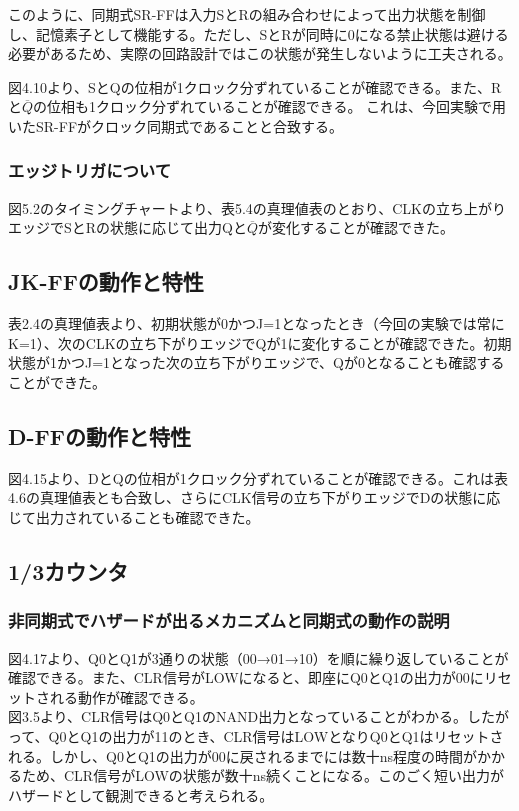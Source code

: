 \documentclass{jlreq}
\numberwithin{equation}{section}
\begin{document}
このように、同期式SR-FFは入力SとRの組み合わせによって出力状態を制御し、記憶素子として機能する。ただし、SとRが同時に0になる禁止状態は避ける必要があるため、実際の回路設計ではこの状態が発生しないように工夫される。

図4.10より、SとQの位相が1クロック分ずれていることが確認できる。また、Rと$\overline{Q}$の位相も1クロック分ずれていることが確認できる。
これは、今回実験で用いたSR-FFがクロック同期式であることと合致する。

\subsubsection{エッジトリガについて}
図5.2のタイミングチャートより、表5.4の真理値表のとおり、CLKの立ち上がりエッジでSとRの状態に応じて出力Qと$\overline{Q}$が変化することが確認できた。

\subsection{JK-FFの動作と特性}
表2.4の真理値表より、初期状態が0かつJ=1となったとき（今回の実験では常にK=1）、次のCLKの立ち下がりエッジでQが1に変化することが確認できた。初期状態が1かつJ=1となった次の立ち下がりエッジで、Qが0となることも確認することができた。

\subsection{D-FFの動作と特性}
図4.15より、DとQの位相が1クロック分ずれていることが確認できる。これは表4.6の真理値表とも合致し、さらにCLK信号の立ち下がりエッジでDの状態に応じて出力されていることも確認できた。

\subsection{1/3カウンタ}
\subsubsection{非同期式でハザードが出るメカニズムと同期式の動作の説明}
図4.17より、Q0とQ1が3通りの状態（00→01→10）を順に繰り返していることが確認できる。また、CLR信号がLOWになると、即座にQ0とQ1の出力が00にリセットされる動作が確認できる。\\

図3.5より、CLR信号はQ0とQ1のNAND出力となっていることがわかる。したがって、Q0とQ1の出力が11のとき、CLR信号はLOWとなりQ0とQ1はリセットされる。しかし、Q0とQ1の出力が00に戻されるまでには数十ns程度の時間がかかるため、CLR信号がLOWの状態が数十ns続くことになる。このごく短い出力がハザードとして観測できると考えられる。\\
\end{document}
